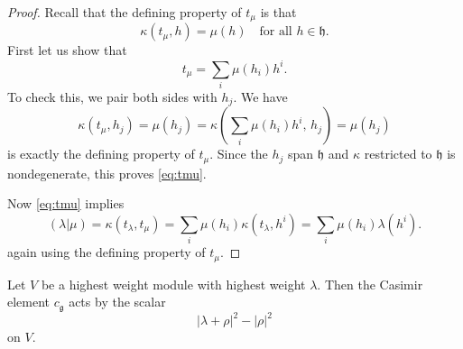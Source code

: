 \documentclass[12pt]{article}
\begin{document}
\begin{proof}
    Recall that the defining property of $t_\mu$ is that
    \[
        \kappa(t_\mu, h) = \mu(h) \quad \text{for all } h \in \mathfrak{h}.
    \]
    First let us show that
    \begin{equation}\label{eq:tmu}
        t_\mu = \sum_i \mu(h_i) h^i.
    \end{equation}
    To check this, we pair both sides with $h_j$. We have
    \[
        \kappa(t_\mu, h_j) = \mu(h_j) =
        \kappa\!\left( \sum_i \mu(h_i) h^i,\, h_j \right) = \mu(h_j)
    \]
    is exactly the defining property of $t_\mu$. Since the $h_j$ span $\mathfrak{h}$ and $\kappa$ restricted to $\mathfrak{h}$ is nondegenerate, this proves \eqref{eq:tmu}.

    Now \eqref{eq:tmu} implies
    \[
        (\lambda|\mu) = \kappa(t_\lambda, t_\mu)
        = \sum_i \mu(h_i)\kappa(t_\lambda, h^i)
        = \sum_i \mu(h_i)\lambda(h^i).
    \]
    again using the defining property of $t_\mu$.
\end{proof}

\begin{proposition}
    Let $V$ be a highest weight module with highest weight $\lambda$.
    Then the Casimir element $c_{\mathfrak{g}}$ acts by the scalar
    \[
        |\lambda + \rho|^2 - |\rho|^2
    \]
    on $V$.
\end{proposition}
\end{document}
